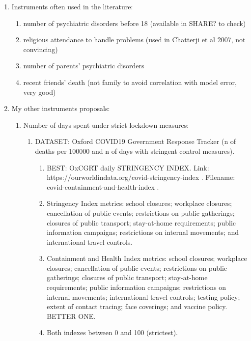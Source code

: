 \documentclass{article}
\begin{document}
\begin{enumerate}
    \item Instruments often used in the literature:
        \begin{enumerate}
            \item number of psychiatric disorders before 18 (available in SHARE? to check)
            \item religious attendance to handle problems (used in Chatterji et al 2007, not convincing)
            \item number of parents' psychiatric disorders 
            \item recent friends' death (not family to avoid correlation with model error, very good)
        \end{enumerate}

    \item My other instruments proposals:
        \begin{enumerate}
            \item Number of days spent under strict lockdown measures:
                \begin{enumerate}
                    \item DATASET: Oxford COVID19 Government Response Tracker (n of deaths per 100000 and n of days with stringent control measures). 
                    \begin{enumerate}
                        \item BEST: OxCGRT daily STRINGENCY INDEX. \newline Link: https://ourworldindata.org/covid-stringency-index . Filename: covid-containment-and-health-index .
                        \item Stringency Index metrics: school closures; workplace closures; cancellation of public events; restrictions on public gatherings; closures of public transport; stay-at-home requirements; public information campaigns; restrictions on internal movements; and international travel controls.
                        \item Containment and Health Index metrics: school closures; workplace closures; cancellation of public events; restrictions on public gatherings; closures of public transport; stay-at-home requirements; public information campaigns; restrictions on internal movements; international travel controls; testing policy; extent of contact tracing; face coverings; and vaccine policy. BETTER ONE.
                        \item Both indexes between 0 and 100 (strictest).
                    \end{enumerate}
                    

\end{enumerate}
\end{enumerate}
\end{enumerate}
\end{document}
